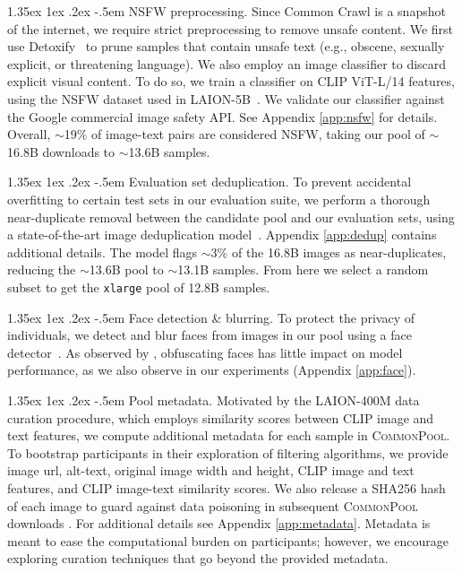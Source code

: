 \documentclass[dvipsnames,11pt]{article}
\makeatletter
\renewcommand\paragraph{\@startsection{paragraph}{4}{\z@}                                     {1.35ex \@plus1ex \@minus.2ex}                                {-.5em}
{\normalfont\normalsize\bfseries}}
\newcommand{\users}{participants\xspace}
\newcommand{\pool}{\textsc{CommonPool}\xspace}
\makeatother
\begin{document}
\paragraph{NSFW preprocessing.}
Since Common Crawl is a snapshot of the internet, we require strict preprocessing to remove unsafe content. We first use Detoxify~\cite{Detoxify} to prune samples that contain unsafe text (e.g., obscene, sexually explicit, or threatening language). 
We also employ an image classifier to discard explicit visual content. To do so, we train a classifier on CLIP ViT-L/14 \cite{radford2021learning} features, using the NSFW dataset used in LAION-5B~\cite{laion5b}. We validate our classifier against the Google commercial image safety API. See Appendix \ref{app:nsfw} for details.
Overall,  $\sim$19\% of image-text pairs are considered NSFW, taking our pool of $\sim$16.8B downloads to $\sim$13.6B samples.

\paragraph{Evaluation set deduplication.}
To prevent accidental overfitting to certain test sets in our evaluation suite, we perform a thorough near-duplicate removal between the candidate pool and our evaluation sets, using a state-of-the-art image deduplication model~\cite{Yokoo2021Dedup}. Appendix \ref{app:dedup} contains additional details.
The model flags $\sim$3\% of the 16.8B images as near-duplicates, reducing the $\sim$13.6B pool to $\sim$13.1B samples.
From here we select a random subset to get the {\small \texttt{xlarge}} pool of 12.8B samples.

\paragraph{Face detection \& blurring.} To protect the privacy of individuals, we detect and blur faces from images in our pool using a face detector~\cite{guo2021sample}. As observed by \citet{yang2022study}, obfuscating faces has little impact on model performance, as we also observe in our experiments (Appendix \ref{app:face}).

\paragraph{Pool metadata.}
Motivated by the LAION-400M data curation procedure, which employs similarity scores between CLIP image and text features, we compute additional metadata for each sample in \pool. 
To bootstrap \users in their exploration of filtering algorithms, we provide image url, alt-text, original image width and height, CLIP image and text features, and CLIP image-text similarity scores.
We also release a SHA256 hash of each image to guard against data poisoning in subsequent \pool downloads \cite{carlini2023poisoning}.
For additional details see Appendix \ref{app:metadata}.
Metadata is meant to ease the computational burden on \users; however, we encourage exploring curation techniques that go beyond the provided metadata.
\end{document}
